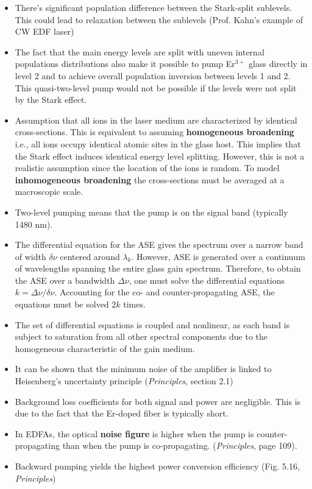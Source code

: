 \documentclass[a4paper]{article}
\begin{document}
\begin{itemize}
	\item There's significant population difference between the Stark-split sublevels. This could lead to relaxation between the sublevels (Prof. Kahn's example of CW EDF laser)
	\item The fact that the main energy levels are split with uneven internal populations distributions also make it possible to pump Er$^{3+}$ glass directly in level 2 and to achieve overall population inversion between levels 1 and 2. This quasi-two-level pump would not be possible if the levels were not split by the Stark effect.
	\item Assumption that all ions in the laser medium are characterized by identical cross-sections. This is equivalent to assuming \textbf{homogeneous broadening} i.e., all ions occupy identical atomic sites in the glass host. This implies that the Stark effect induces identical energy level splitting. However, this is not a realistic assumption since the location of the ions is random. To model \textbf{inhomogeneous broadening} the cross-sections must be averaged at a macroscopic scale. 
	\item Two-level pumping means that the pump is on the signal band (typically 1480 nm).
	\item The differential equation for the ASE gives the spectrum over a narrow band of width $\delta\nu$ centered around $\lambda_k$. However, ASE is generated over a continuum of wavelengths spanning the entire glass gain spectrum. Therefore, to obtain the ASE over a bandwidth $\Delta\nu$, one must solve the differential equations $k = \Delta\nu/\delta\nu$. Accounting for the co- and counter-propagating ASE, the equations must be solved $2k$ times.
	\item The set of differential equations is coupled and nonlinear, as each band is subject to saturation from all other spectral components due to the homogeneous characteristic of the gain medium. 
	\item It can be shown that the minimum noise of the amplifier is linked to Heisenberg's uncertainty principle (\textit{Principles}, section 2.1) 
	\item Background loss coefficients for both signal and power are negligible. This is due to the fact that the Er-doped fiber is typically short.
	\item In EDFAs, the optical \textbf{noise figure} is higher when the pump is counter-propagating than when the pump is co-propagating. (\textit{Principles}, page 109).
	\item Backward pumping yields the highest power conversion efficiency (Fig. 5.16, \textit{Principles})
\end{itemize}




\end{document}

